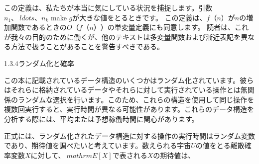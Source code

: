 この定義は、私たちが本当に気にしている状況を捕捉します。引数$ n_1、\ ldots、n_k $ make $ g $が大きな値をとるときです。 この定義は、$ f（n）$が$ n $の増加関数であるときの$ O（f（n））$の単変量定義にも同意します。 読者は、これが我々の目的のために働くが、他のテキストは多変量関数および漸近表記を異なる方法で扱うことがあることを警告すべきである。

1.3.4ランダム化と確率

この本に記載されているデータ構造のいくつかはランダム化されています。彼らはそれらに格納されているデータやそれらに対して実行されている操作とは無関係のランダムな選択を行います。このため、これらの構造を使用して同じ操作を複数回実行すると、実行時間が異なる可能性があります。これらのデータ構造を分析する際には、平均または予想稼働時間に関心があります。

正式には、ランダム化されたデータ構造に対する操作の実行時間はランダム変数であり、期待値を調べたいと考えています。数えられる宇宙$ U $の値をとる離散確率変数$ X $に対して、$ \ mathrm {E} [X] $で表される$ X $の期待値は、

